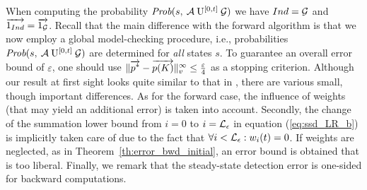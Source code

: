 \documentclass[times, 10pt,twocolumn]{article}
\begin{document}
		When computing the probability $\mbox{\it Prob}(s, \: \mathcal{A} \: \mathrm{U}^{[0,t]} \: \mathcal{G} )$ we have $Ind = \mathcal{G}$ and $\overrightarrow{1_{Ind}} = \overrightarrow{1_{\mathcal{G}}}$. Recall that the main difference with the forward algorithm is that we now employ a global model-checking procedure, i.e., probabilities $\mbox{\it Prob}(s, \: \mathcal{A} \: \mathrm{U}^{[0,t]} \: \mathcal{G} )$ are determined for \emph{all} states $s$. To guarantee an overall error bound of $\varepsilon$, one should use $\lVert  \overrightarrow{p^{*}} - \overrightarrow{p(K)}  \rVert_{v}^{\infty} \leq \frac{\varepsilon}{4}$ as a stopping criterion.  Although our result at first sight looks quite similar to that in \cite{YounesKNP_STTT05}, there are various small, though important differences.  As for the forward case, the influence of weights (that may yield an additional error) is taken into account.  Secondly, the change of the summation lower bound from $i=0$ to $i=\mathcal{L}_{\epsilon}$ in equation (\ref{eq:ssd_LR_b}) is implicitly taken care of due to the fact that $\forall i < \mathcal{L}_{\epsilon} : w_{i}(t) = 0$. If weights are neglected, as in Theorem~\ref{th:error_bwd_initial}, an error bound is obtained that is too liberal. Finally, we remark that the steady-state detection error is one-sided for backward computations.
\end{document}
